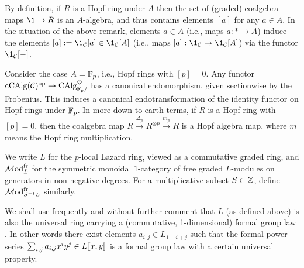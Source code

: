 \begin{example}
By definition, if $R$ is a Hopf ring under $A$ then the set of (graded) coalgebra maps $\1 \to R$ is an $A$-algebra, and thus contains elements $[a]$ for any $a \in A$.
In the situation of the above remark, elements $a \in A$ (i.e., maps $a: * \to A$) induce the elements $[a] := \1_\scr{C}[a] \in \1_\scr{C}[A]$ (i.e., maps $[a]: \1_\scr{C} \to \1_\scr{C}[A]$) via the functor $\1_\scr{C}[\ph]$.
\end{example}

\begin{example} \label{ex:hopfring-frob}
Consider the case $A=\mathbb{F}_p$, i.e., Hopf rings with $[p]=0$.
Any functor $\mathrm{cCAlg}(\mathcal C)^{\mathrm{op}} \to \mathrm{CAlg}_{\mathbb{F}_p/}^\heartsuit$ has a canonical endomorphism, given sectionwise by the Frobenius.
This induces a canonical endotransformation of the identity functor on Hopf rings under $\mathbb{F}_p$.
In more down to earth terms, if $R$ is a Hopf ring with $[p]=0$, then the coalgebra map $R \xrightarrow{\Delta_p} R^{\otimes p} \xrightarrow{m_p} R$ is a Hopf algebra map, where $m$ means the Hopf ring multiplication.
\end{example}

\begin{definition} \label{def:ModLfr}
We write $L$ for the $p$-local Lazard ring, viewed as a commutative graded ring, and $\mathcal{M}\mathrm{od}_L^{\mathrm{fr}}$ for the symmetric monoidal $1$-category of free graded $L$-modules on generators in non-negative degrees.
For a multiplicative subset $S \subset \mathbb{Z}$, define $\mathcal{M}\mathrm{od}_{S^{-1}L}^{\mathrm{fr}}$ similarly.
\end{definition}
\begin{remark}\label{rmk:lazard-ring}
We shall use frequently and without further comment that $L$ (as defined above) is also the universal ring carrying a (commutative, 1-dimensional) formal group law \cite{quillen-MU}.
In other words there exist elements $a_{i,j} \in L_{1+i+j}$ such that the formal power series $\sum_{i,j} a_{i,j} x^i y^j \in L\llbracket x,y \rrbracket$ is a formal group law with a certain universal property.
\end{remark}

